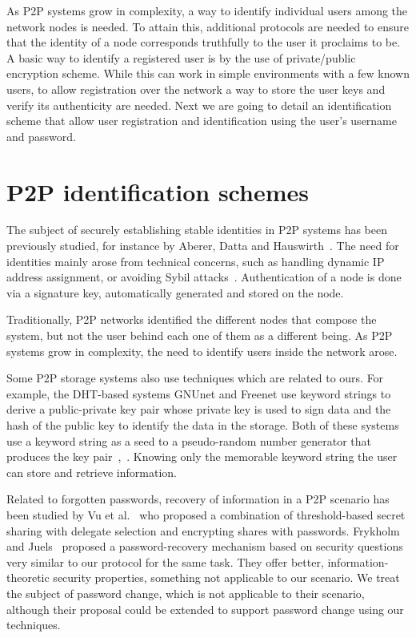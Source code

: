 As P2P systems grow in complexity, a way to identify individual users among the
network nodes is needed. To attain this, additional protocols are needed to
ensure that the identity of a node corresponds truthfully to the user it
proclaims to be. A basic way to identify a registered user is by the use of
private/public encryption scheme. While this can work in simple environments
with a few known users, to allow registration over the network a way to store
the user keys and verify its authenticity are needed.
Next we are going to detail an identification scheme that allow user
registration and identification using the user's username and password.

\section{P2P identification schemes}

The subject of securely establishing stable identities in P2P
systems has been previously studied, for instance by Aberer,
Datta and Hauswirth~\cite{1318567}. The need for identities mainly arose
from technical concerns, such as handling dynamic IP address
assignment, or avoiding Sybil attacks~\cite{the_sybil_attack}. Authentication of a
node is done via a signature key, automatically generated and
stored on the node.

Traditionally, P2P networks identified the different nodes that compose the
system, but not the user behind each one of them as a different being.
As P2P systems grow in complexity, the need to identify users inside the
network arose.

Some P2P storage systems also use techniques which are
related to ours. For example, the DHT-based systems GNUnet
and Freenet use keyword strings to derive a public-private key
pair whose private key is used to sign data and the hash of
the public key to identify the data in the storage. Both of
these systems use a keyword string as a seed to a pseudo-random number
generator that produces the key pair~\cite{clarke2010private},~\cite{Bennett03anencoding}.
Knowing only the memorable keyword string the user can
store and retrieve information.

Related to forgotten passwords, recovery of information in a
P2P scenario has been studied by Vu et al.~\cite{5380695} who proposed
a combination of threshold-based secret sharing with delegate
selection and encrypting shares with passwords.
Frykholm and Juels~\cite{Frykholm:2001:EPR:501983.501985} proposed a password-recovery
mechanism based on security questions very similar to our
protocol for the same task. They offer better, information-
theoretic security properties, something not applicable to our
scenario. We treat the subject of password change, which is not applicable to
their scenario, although their proposal could be extended to support password
change using our techniques.


